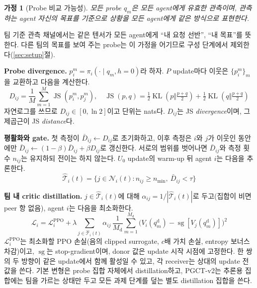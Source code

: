 \documentclass[twocolumn,10pt]{article}
\newtheorem{assumption}{가정}
\theoremstyle{remark}
\newcommand{\sg}{\operatorname{sg}}
\newcommand{\JS}{\operatorname{JS}}
\newcommand{\KL}{\operatorname{KL}}
\newcommand{\ours}{PGCT}
\begin{document}
\begin{assumption}[Probe 비교 가능성]
\label{as:comparability}
모든 probe $q_m$은 모든 agent에게 유효한 관측이며, 관측하는 agent 자신의 목표를 기준으로 상황을 모든 agent에게 같은 방식으로 표현한다.
\end{assumption}
팀 기준 관측 채널에서는 같은 텐서가 모든 agent에게 ``내 요청 선반'', ``내 목표''를 뜻한다. 다른 팀의 목표를 보여 주는 probe는 이 가정을 어기므로 구성 단계에서
제외한다(\ref{sec:setup}절).

\textbf{Probe divergence.} $p_i^m=\pi_i(\cdot\mid q_m,h=0)$라 하자. $P$ update마다 이웃은 $\{p_i^m\}_m$을 교환하고 다음을 계산한다.
\begin{equation}
  D_{ij}=\frac{1}{M}\sum_{m=1}^{M}\JS(p_i^m,p_j^m),\quad
  \JS(p,q)=\tfrac12\KL(p\Vert\tfrac{p+q}{2})+\tfrac12\KL(q\Vert\tfrac{p+q}{2})
  \label{eq:div}
\end{equation}
자연로그를 쓰므로 $D_{ij}\in[0,\ln 2]$이고 단위는 nats다. $D_{ij}$는 JS \emph{divergence}이며, 그 제곱근이 JS \emph{distance}다.

\textbf{평활화와 gate.} 첫 측정이 $\bar D_{ij}\gets D_{ij}$로 초기화하고, 이후 측정은 $i$와 $j$가 이웃인 동안에만 $\bar D_{ij}\gets(1-\beta)\bar D_{ij}+\beta D_{ij}$로
갱신한다. 서로의 범위를 벗어나면 $\bar D_{ij}$와 측정 횟수 $n_{ij}$는 유지하되 전이는 하지 않는다. $U_0$ update의 warm-up 뒤 agent $i$는 다음을 추론한다.
\begin{equation}
  \hat{\mathcal{T}}_i(t)=\{j\in\mathcal{N}_i(t): n_{ij}\ge n_{\min},\ \bar D_{ij}<\tau\}
\end{equation}

\textbf{팀 내 critic distillation.} $j\in\hat{\mathcal{T}}_i(t)$에 대해 $\alpha_{ij}=1/|\hat{\mathcal{T}}_i(t)|$로 두고(집합이 비면 peer 항 없음), agent $i$는 다음을 최소화한다.
\begin{equation}
  \mathcal{L}_i=\mathcal{L}^{\mathrm{PPO}}_i+\lambda\sum_{j\in\hat{\mathcal{T}}_i(t)}\alpha_{ij}\,
  \frac{1}{M_{\mathrm{d}}}\sum_{m=1}^{M_{\mathrm{d}}}\big(V_i(q^{\mathrm{d}}_m)-\sg[V_j(q^{\mathrm{d}}_m)]\big)^2
  \label{eq:loss}
\end{equation}
$\mathcal{L}^{\mathrm{PPO}}_i$는 최소화할 PPO 손실(음의 clipped surrogate, $c$배 가치 손실, entropy 보너스 차감)이고, $\sg$는 stop-gradient이며, donor 값은 update 시작
시점에 고정한다. 한 쌍의 두 방향이 같은 update에서 함께 활성일 수 있고, 각 receiver는 상대의 update 전 값을 쓴다. 기본 변형은 probe 집합 자체에서 distillation하고,
\ours{}-v2는 추론용 집합에는 팀을 가르는 상태만 두고 모든 과제 단계를 덮는 별도 distillation 집합을 쓴다.
\end{document}
